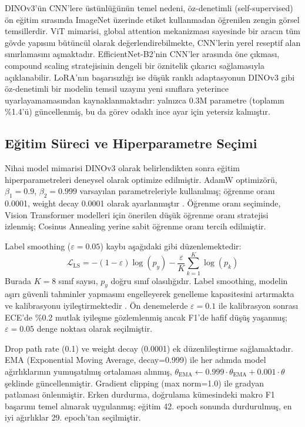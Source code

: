 \documentclass[conference]{IEEEtran}
\begin{document}
DINOv3'ün CNN'lere üstünlüğünün temel nedeni, öz-denetimli (self-supervised) ön eğitim sırasında ImageNet üzerinde etiket kullanmadan öğrenilen zengin görsel temsillerdir. ViT mimarisi, global attention mekanizması sayesinde bir aracın tüm gövde yapısını bütüncül olarak değerlendirebilmekte, CNN'lerin yerel reseptif alan sınırlamasını aşmaktadır. EfficientNet-B2'nin CNN'ler arasında öne çıkması, compound scaling stratejisinin dengeli bir öznitelik çıkarıcı sağlamasıyla açıklanabilir. LoRA'nın başarısızlığı ise düşük ranklı adaptasyonun DINOv3 gibi öz-denetimli bir modelin temsil uzayını yeni sınıflara yeterince uyarlayamamasından kaynaklanmaktadır: yalnızca 0.3M parametre (toplamın \%1.4'ü) güncellenmiş, bu da görev odaklı ince ayar için yetersiz kalmıştır.

\subsection{Eğitim Süreci ve Hiperparametre Seçimi}
Nihai model mimarisi DINOv3 olarak belirlendikten sonra eğitim hiperparametreleri deneysel olarak optimize edilmiştir. AdamW optimizörü, $\beta_1=0.9$, $\beta_2=0.999$ varsayılan parametreleriyle kullanılmış; öğrenme oranı 0.0001, weight decay 0.0001 olarak ayarlanmıştır \cite{loshchilov2019adamw}. Öğrenme oranı seçiminde, Vision Transformer modelleri için önerilen düşük öğrenme oranı stratejisi izlenmiş; Cosinus Annealing yerine sabit öğrenme oranı tercih edilmiştir.

Label smoothing ($\varepsilon=0.05$) kaybı aşağıdaki gibi düzenlemektedir:
\begin{equation}
\mathcal{L}_{\text{LS}} = -(1-\varepsilon) \log(p_y) - \frac{\varepsilon}{K} \sum_{k=1}^{K} \log(p_k)
\end{equation}
Burada $K=8$ sınıf sayısı, $p_y$ doğru sınıf olasılığıdır. Label smoothing, modelin aşırı güvenli tahminler yapmasını engelleyerek genelleme kapasitesini artırmakta ve kalibrasyonu iyileştirmektedir \cite{szegedy2016inception}. Ön denemelerde $\varepsilon=0.1$ ile kalibrasyon sonrası ECE'de \%0.2 mutlak iyileşme gözlemlenmiş ancak F1'de hafif düşüş yaşanmış; $\varepsilon=0.05$ denge noktası olarak seçilmiştir.

Drop path rate (0.1) ve weight decay (0.0001) ek düzenlileştirme sağlamaktadır. EMA (Exponential Moving Average, decay=0.999) ile her adımda model ağırlıklarının yumuşatılmış ortalaması alınmış, $\theta_{\text{EMA}} \leftarrow 0.999 \cdot \theta_{\text{EMA}} + 0.001 \cdot \theta$ şeklinde güncellenmiştir. Gradient clipping (max norm=1.0) ile gradyan patlaması önlenmiştir. Erken durdurma, doğrulama kümesindeki makro F1 başarımı temel alınarak uygulanmış; eğitim 42. epoch sonunda durdurulmuş, en iyi ağırlıklar 29. epoch'tan seçilmiştir.
\end{document}
